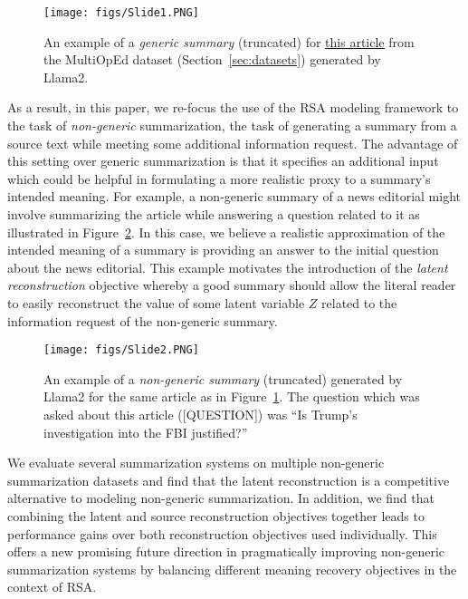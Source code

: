 \documentclass[11pt]{article}
\begin{document}
\begin{figure}[t]
    \centering
    \texttt{[image: figs/Slide1.PNG]}
    \caption{An example of a \emph{generic summary} (truncated) for \href{https://www.cnn.com/2018/05/21/opinions/trump-investigation-order-twitter-opinion-callan/index.html}{\underline{this article}} from the MultiOpEd dataset (Section~\ref{sec:datasets}) generated by Llama2.}
    \label{fig:example-generic-summ-llama}
\end{figure}

As a result, in this paper, we re-focus the use of the RSA modeling framework to the task of \emph{non-generic} summarization, the task of generating a summary from a source text while meeting some additional information request. The advantage of this setting over generic summarization is that it specifies an additional input which could be helpful in formulating a more realistic proxy to a summary's intended meaning. For example, a non-generic summary of a news editorial might involve summarizing the article while answering a question related to it as illustrated in Figure~\ref{fig:example-non-generic-summ-llama}. In this case, we believe a realistic approximation of the intended meaning of a summary is providing an answer to the initial question about the news editorial. This example motivates the introduction of the \emph{latent reconstruction} objective whereby a good summary should allow the literal reader to easily reconstruct the value of some latent variable $Z$ related to the information request of the non-generic summary.

\begin{figure}[t]
    \centering
    \texttt{[image: figs/Slide2.PNG]}
    \caption{An example of a \emph{non-generic summary} (truncated) generated by Llama2 for the same article as in Figure~\ref{fig:example-generic-summ-llama}. The question which was asked about this article ([QUESTION]) was ``Is Trump's investigation into the FBI justified?''}
    \label{fig:example-non-generic-summ-llama}
\end{figure}

We evaluate several summarization systems on multiple non-generic summarization datasets and find that the latent reconstruction is a competitive alternative to modeling non-generic summarization. In addition, we find that combining the latent and source reconstruction objectives together leads to performance gains over both reconstruction objectives used individually. This offers a new promising future direction in pragmatically improving non-generic summarization systems by balancing different meaning recovery objectives in the context of RSA.
\end{document}
